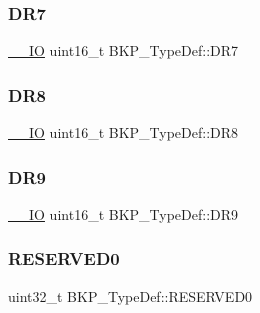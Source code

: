 \mbox{\label{struct_b_k_p___type_def_a2467a2e314a670b8638ad75f6d9122bf}} 
\subsubsection{\texorpdfstring{DR7}{DR7}}
{\footnotesize\ttfamily \mbox{\hyperlink{group___c_m_s_i_s___c_m3__core__definitions_gaec43007d9998a0a0e01faede4133d6be}{\+\_\+\+\_\+\+IO}} uint16\+\_\+t B\+K\+P\+\_\+\+Type\+Def\+::\+D\+R7}

\mbox{\label{struct_b_k_p___type_def_a70ccbdbdaf902903f378f110685ee647}} 
\subsubsection{\texorpdfstring{DR8}{DR8}}
{\footnotesize\ttfamily \mbox{\hyperlink{group___c_m_s_i_s___c_m3__core__definitions_gaec43007d9998a0a0e01faede4133d6be}{\+\_\+\+\_\+\+IO}} uint16\+\_\+t B\+K\+P\+\_\+\+Type\+Def\+::\+D\+R8}

\mbox{\label{struct_b_k_p___type_def_abb6f0e3c783959e88117f81a981c4000}} 
\subsubsection{\texorpdfstring{DR9}{DR9}}
{\footnotesize\ttfamily \mbox{\hyperlink{group___c_m_s_i_s___c_m3__core__definitions_gaec43007d9998a0a0e01faede4133d6be}{\+\_\+\+\_\+\+IO}} uint16\+\_\+t B\+K\+P\+\_\+\+Type\+Def\+::\+D\+R9}

\mbox{\label{struct_b_k_p___type_def_a8b41b52d05011ff2ed2b85977ea20413}} 
\subsubsection{\texorpdfstring{RESERVED0}{RESERVED0}}
{\footnotesize\ttfamily uint32\+\_\+t B\+K\+P\+\_\+\+Type\+Def\+::\+R\+E\+S\+E\+R\+V\+E\+D0}

